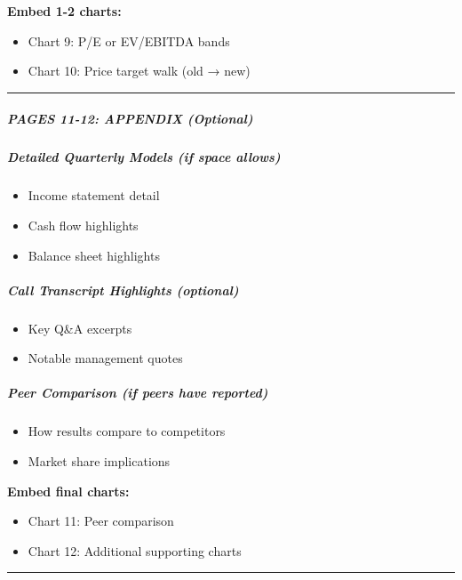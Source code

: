 \documentclass[11pt]{article}
\begin{document}
\textbf{Embed 1-2 charts:}

\begin{itemize}[leftmargin=*,itemsep=2pt,topsep=2pt]
\item {} Chart 9: P/E or EV/EBITDA bands
\item {} Chart 10: Price target walk (old → new)
\end{itemize}

\vspace{0.5em}\hrule\vspace{0.5em}

\subparagraph{PAGES 11-12: APPENDIX (Optional)}\mbox{}\par

\subparagraph{Detailed Quarterly Models (if space allows)}\mbox{}\par
\begin{itemize}[leftmargin=*,itemsep=2pt,topsep=2pt]
\item {} Income statement detail
\item {} Cash flow highlights
\item {} Balance sheet highlights
\end{itemize}

\subparagraph{Call Transcript Highlights (optional)}\mbox{}\par
\begin{itemize}[leftmargin=*,itemsep=2pt,topsep=2pt]
\item {} Key Q\&A excerpts
\item {} Notable management quotes
\end{itemize}

\subparagraph{Peer Comparison (if peers have reported)}\mbox{}\par
\begin{itemize}[leftmargin=*,itemsep=2pt,topsep=2pt]
\item {} How results compare to competitors
\item {} Market share implications
\end{itemize}

\textbf{Embed final charts:}

\begin{itemize}[leftmargin=*,itemsep=2pt,topsep=2pt]
\item {} Chart 11: Peer comparison
\item {} Chart 12: Additional supporting charts
\end{itemize}

\vspace{0.5em}\hrule\vspace{0.5em}
\end{document}
